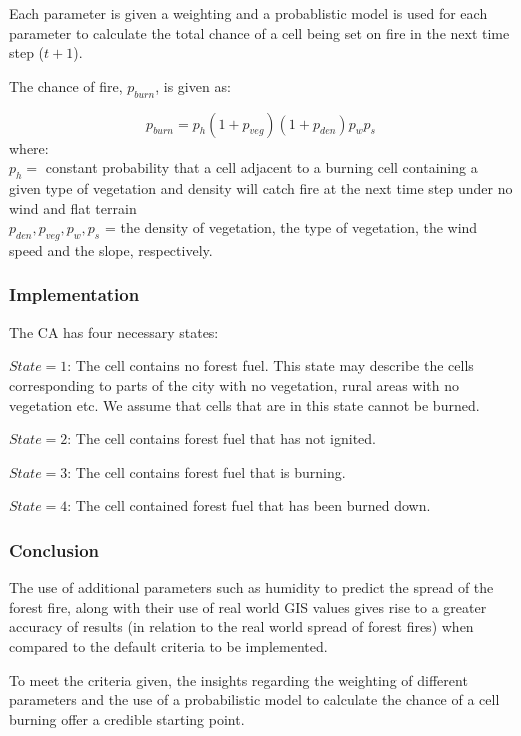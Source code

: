 \documentclass[11pt, a4paper, titlepage]{article}
\begin{document}
    Each parameter is given a weighting and a probablistic model is used for each parameter to calculate the total chance of a cell being set on fire in the next time step ($t+1$).

    The chance of fire, $p_{burn}$, is given as:

    \[ p_{burn} = p_h(1+p_{veg})(1+p_{den})p_wp_s \]
    where: \\
    $p_h = $ constant probability that a cell adjacent to a burning cell containing a given type of vegetation and density will catch fire at the next time step under no wind and flat terrain \\
    $p_{den}, p_{veg}, p_w, p_s$ = the density of vegetation, the type of vegetation, the wind speed and the slope, respectively.



  \subsubsection{Implementation}
  
  The CA has four necessary states:
  
  $State = 1$: The cell contains no forest fuel. This state may describe the cells corresponding to parts of the city with no vegetation, rural areas with no vegetation etc. We assume that cells that are in this state cannot be burned.
  
  $State = 2$: The cell contains forest fuel that has not ignited.
  
  $State = 3$: The cell contains forest fuel that is burning.
  
  $State = 4$: The cell contained forest fuel that has been burned down.

  
  
  
  \subsubsection{Conclusion}
  The use of additional parameters such as humidity to predict the spread of the forest fire, along with their use of real world GIS values gives rise to a greater accuracy of results (in relation to the real world spread of forest fires) when compared to the default criteria to be implemented.

  To meet the criteria given, the insights regarding the weighting of different parameters and the use of a probabilistic model to calculate the chance of a cell burning offer a credible starting point.
\end{document}
